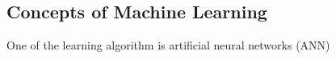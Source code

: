 \subsection{Concepts of Machine Learning}
One of the learning algorithm is artificial neural networks (ANN)